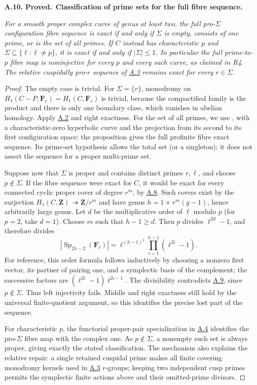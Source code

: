 \documentclass[11pt,a4paper]{article}
\newcommand{\Z}{\mathbf Z}
\newcommand{\F}{\mathbf F}
\newenvironment{claim}[3]{\par\medskip\noindent\hypertarget{#1}{\textbf{#1. #2.}}\ \textbf{#3.}\par\nopagebreak\smallskip\begingroup\itshape}{\endgroup\par\smallskip}
\newcommand{\statementref}[1]{\hyperlink{#1}{#1}}
\begin{document}
\begin{claim}{A.10}{Proved}{Classification of prime sets for the full fibre sequence}
For a smooth proper complex curve of genus at least two, the full
pro-$\Sigma$ configuration fibre sequence is exact if and only if
$\Sigma$ is empty, consists of one prime, or is the set of all
primes. If $C$ instead has characteristic $p$ and
$\Sigma\subseteq\{\ell:\ell\ne p\}$, it is exact if and only if
$|\Sigma|\leq1$. In particular the full prime-to-$p$ fibre map is
noninjective for every $p$ and every such curve, as claimed in R4.
The relative cuspidally pro-$r$ sequence of
\statementref{A.3} remains exact for every $r\in\Sigma$.
\end{claim}
\begin{proof}
The empty case is trivial. For $\Sigma=\{r\}$, monodromy on
$H_1(C-P,\F_r)=H_1(C,\F_r)$ is trivial, because the compactified
family is the product and there is only one boundary class, which
vanishes in abelian homology. Apply \statementref{A.2} and right
exactness. For the set of all primes, we use
\citet[Proposition 2.2]{LA_MT2008}, with a characteristic-zero
hyperbolic curve and the projection from its second to its first
configuration space: the proposition gives the full profinite fibre
exact sequence. Its prime-set hypothesis allows the total set (or a
singleton); it does not assert the sequence for a proper multi-prime
set.

Suppose now that $\Sigma$ is proper and contains distinct primes
$r,\ell$, and choose $p\notin\Sigma$. If the fibre sequence were
exact for $C$, it would be exact for every connected cyclic proper
cover of degree $r^m$, by \statementref{A.8}. Such covers exist by
the surjection $H_1(C,\Z)\twoheadrightarrow\Z/r^m$ and have genus
$h=1+r^m(g-1)$, hence arbitrarily large genus. Let $d$ be the
multiplicative order of $\ell$ modulo $p$ (for $p=2$, take $d=1$).
Choose $m$ such that $h-1\geq d$. Then $p$ divides
$\ell^{2d}-1$, and therefore divides
\[
 |\operatorname{Sp}_{2h-2}(\F_\ell)|
       =\ell^{(h-1)^2}\prod_{i=1}^{h-1}(\ell^{2i}-1).
\]
For reference, this order formula follows inductively by choosing a
nonzero first vector, its partner of pairing one, and a symplectic
basis of the complement; the successive factors are
$(\ell^{2i}-1)\ell^{2i-1}$. The divisibility contradicts
\statementref{A.9}, since $p\notin\Sigma$. Thus left injectivity
fails. Middle and right exactness still hold by the universal
finite-quotient argument, so this identifies the precise lost part
of the sequence.

For characteristic $p$, the functorial proper-pair specialization in
\statementref{A.4} identifies the pro-$\Sigma$ fibre map with the
complex one. As $p\notin\Sigma$, a nonempty such set is always
proper, giving exactly the stated classification. The mechanism also
explains the relative repair: a single retained cuspidal prime makes
all finite covering monodromy kernels used in
\statementref{A.3} $r$-groups; keeping two independent cusp primes
permits the symplectic finite actions above and their omitted-prime
divisors.
\end{proof}
\end{document}

